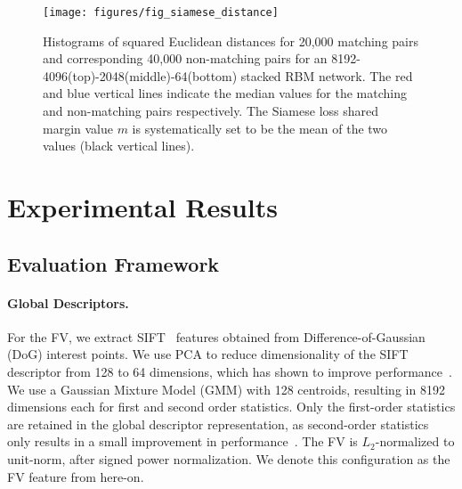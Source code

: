 \documentclass[10pt,twocolumn,letterpaper]{article}
\begin{document}
\begin{figure}
	\centering
		\texttt{[image: figures/fig\_siamese\_distance]}
		\caption{\footnotesize Histograms of squared Euclidean distances for 20,000 matching pairs  and corresponding 40,000 non-matching pairs for an 8192-4096(top)-2048(middle)-64(bottom) stacked RBM network. 
The red and blue vertical lines indicate the median values for the matching and non-matching pairs respectively.
The Siamese loss shared margin value $m$ is systematically set to be the mean of the two values (black vertical lines).}
	
	\label{fig:margin2}
\end{figure}

\section{Experimental Results}
\label{sec:exp}



\subsection{Evaluation Framework}
\label{sec:eval_framework}


\paragraph{Global Descriptors.}
For the FV, we extract SIFT~\cite{Lowe04} features obtained from Difference-of-Gaussian (DoG) interest points.  
We use PCA to reduce dimensionality of the SIFT descriptor from 128 to 64 dimensions, which has shown to improve performance~\cite{Jegou_CVPR_10}.
We use a Gaussian Mixture Model (GMM) with 128 centroids, resulting in 8192 dimensions each for first and second order statistics.
Only the first-order statistics are retained in the global descriptor representation, as second-order statistics only results in a small improvement in performance~\cite{SFCV}.
The FV is $L_2$-normalized to unit-norm, after signed power normalization.
We denote this configuration as the FV feature from here-on.
\end{document}
